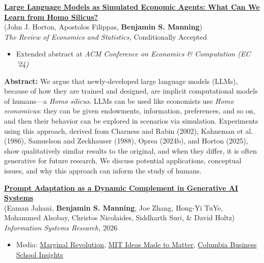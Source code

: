 \documentclass[margin,line,pifont,palatino,courier, 9pt]{res}
\begin{document}
\begin{resume}
\href{https://benjaminmanning.com/files/homo_silicus.pdf}{\bf Large Language Models as Simulated Economic Agents: What Can We Learn from Homo Silicus?}\\
(John J. Horton\footnotemark[\value{footnote}], Apostolos Filippas\footnotemark[\value{footnote}], \textbf{Benjamin S. Manning}\footnotemark[\value{footnote}])\\
\textit{The Review of Economics and Statistics,} Conditionally Accepted
\vspace{0.25cm}
\begin{itemize}
\item Extended abstract at \textit{ACM Conference on Economics \& Computation (EC '24)}
\end{itemize}
\vspace{-0.25cm}

\begin{singlespace}
\footnotesize
\textbf{Abstract:}
We argue that newly-developed large language models (LLMs), because of how they are trained and designed, are implicit computational models of humans---a \emph{Homo silicus}.
LLMs can be used like economists use \emph{Homo economicus}: they can be given endowments, information, preferences, and so on, and then their behavior can be explored in scenarios via simulation.
Experiments using this approach, derived from Charness and Rabin (2002), Kahneman et al. (1986), Samuelson and Zeckhauser (1988), Oprea (2024b), and Horton (2025), show qualitatively similar results to the original, and when they differ, it is often generative for future research.
We discuss potential applications, conceptual issues, and why this approach can inform the study of humans.
\end{singlespace}

\href{https://pubsonline.informs.org/doi/full/10.1287/isre.2025.2029}{\bf Prompt Adaptation as a Dynamic Complement in Generative AI Systems}\\
(Eaman Jahani\footnotemark[\value{footnote}], \textbf{Benjamin S. Manning}, Joe Zhang, Hong-Yi TuYe, Mohammed Alsobay, Christos Nicolaides, Siddharth Suri, \& David Holtz)\\
\textit{Information Systems Research,} 2026
\vspace{0.25cm}
\begin{itemize}
\item Media: \href{https://marginalrevolution.com/marginalrevolution/2025/08/monday-assorted-links-522.html}{Marginal Revolution}, \href{https://mitsloan.mit.edu/ideas-made-to-matter/study-generative-ai-results-depend-user-prompts-much-models}{MIT Ideas Made to Matter}, \href{https://business.columbia.edu/insights/better-ai-doesnt-always-mean-better-outcomes}{Columbia Business School Insights}
\end{itemize}
\vspace{-0.25cm}


\end{resume}
\end{document}

